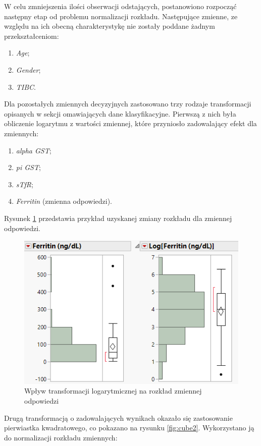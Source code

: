 	W celu zmniejszenia ilości obserwacji odstających, postanowiono rozpocząć następny etap od problemu normalizacji rozkładu. Następujące zmienne, ze względu na ich obecną charakterystykę nie zostały poddane żadnym przekształceniom:
	
	\begin{enumerate}
		\item \textit{Age};
		\item \textit{Gender};
		\item \textit{TIBC}.
	\end{enumerate}

	Dla pozostałych zmiennych decyzyjnych zastosowano trzy rodzaje transformacji opisanych w sekcji omawiających dane klasyfikacyjne. Pierwszą z nich była obliczenie logarytmu z wartości zmiennej, które przyniosło zadowalający efekt dla zmiennych:
	
	\begin{enumerate}
		\item \textit{alpha GST};
		\item \textit{pi GST};
		\item \textit{sTfR};
		\item \textit{Ferritin} (zmienna odpowiedzi).
	\end{enumerate}

	Rysunek \ref{fig:log2} przedstawia przykład uzyskanej zmiany rozkładu dla zmiennej odpowiedzi.
	
	\begin{figure}[!ht]
		\centering
		\includegraphics[width=0.7\linewidth]{Rozdzial3/log2}
		\caption{Wpływ transformacji logarytmicznej na rozkład zmiennej odpowiedzi}
		\label{fig:log2}
	\end{figure}

	Drugą transformacją o zadowalających wynikach okazało się zastosowanie pierwiastka kwadratowego, co pokazano na rysunku \ref{fig:cube2}. Wykorzystano ją do normalizacji rozkładu zmiennych:
	
